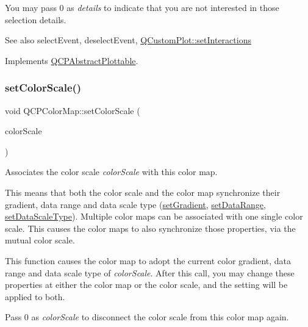 You may pass 0 as {\itshape details} to indicate that you are not interested in those selection details.

\begin{DoxySeeAlso}{See also}
select\+Event, deselect\+Event, \mbox{\hyperlink{class_q_custom_plot_a5ee1e2f6ae27419deca53e75907c27e5}{Q\+Custom\+Plot\+::set\+Interactions}} 
\end{DoxySeeAlso}


Implements \mbox{\hyperlink{class_q_c_p_abstract_plottable_a38efe9641d972992a3d44204bc80ec1d}{Q\+C\+P\+Abstract\+Plottable}}.

\mbox{\label{class_q_c_p_color_map_aa828921db364fe3c6af4619580ab85fd}} 
\subsubsection{\texorpdfstring{set\+Color\+Scale()}{setColorScale()}}
{\footnotesize\ttfamily void Q\+C\+P\+Color\+Map\+::set\+Color\+Scale (\begin{DoxyParamCaption}\item[{\mbox{\hyperlink{class_q_c_p_color_scale}{Q\+C\+P\+Color\+Scale}} $\ast$}]{color\+Scale }\end{DoxyParamCaption})}

Associates the color scale {\itshape color\+Scale} with this color map.

This means that both the color scale and the color map synchronize their gradient, data range and data scale type (\mbox{\hyperlink{class_q_c_p_color_map_a7313c78360471cead3576341a2c50377}{set\+Gradient}}, \mbox{\hyperlink{class_q_c_p_color_map_a980b42837821159786a85b4b7dcb8774}{set\+Data\+Range}}, \mbox{\hyperlink{class_q_c_p_color_map_a9d20aa08e3c1f20f22908c45b9c06511}{set\+Data\+Scale\+Type}}). Multiple color maps can be associated with one single color scale. This causes the color maps to also synchronize those properties, via the mutual color scale.

This function causes the color map to adopt the current color gradient, data range and data scale type of {\itshape color\+Scale}. After this call, you may change these properties at either the color map or the color scale, and the setting will be applied to both.

Pass 0 as {\itshape color\+Scale} to disconnect the color scale from this color map again. \mbox{\label{class_q_c_p_color_map_a5a23e133a20c4ccad35fd32e6c0f9809}} 
